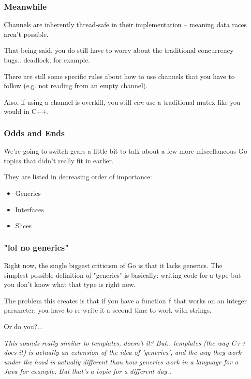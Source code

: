 \documentclass{beamer}
\begin{document}
\begin{frame}
\frametitle{Meanwhile}

Channels are inherently thread-safe in their implementation -- meaning data races aren't possible.

That being said, you do still have to worry about the traditional concurrency bugs.. deadlock, for example.

There are still some specific rules about how to use channels that you have to follow (e.g. not reading from an empty channel).

Also, if using a channel is overkill, you still \textit{can} use a traditional mutex like you would in C++.

\end{frame}

\begin{frame}
\frametitle{Odds and Ends}

We're going to switch gears a little bit to talk about a few more miscellaneous Go topics that didn't really fit in earlier. 

They are listed in decreasing order of importance:

\begin{itemize}
\item Generics
\item Interfaces
\item Slices
\end{itemize}

\end{frame}

\begin{frame}
\frametitle{"lol no generics"}

Right now, the single biggest criticism of Go is that it lacks generics. The simplest possible definition of "generics" is basically: writing code for a type but you don't know what that type is right now.

\vspace{0.5cm}

The problem this creates is that if you have a function \texttt{f} that works on an integer parameter, you have to re-write it a second time to work with strings.

\vspace{0.5cm}

Or do you?...


\hrulefill

\textit{This sounds really similar to templates, doesn't it? But.. templates (the way C++ does it) is actually an extension of the idea of 'generics', and the way they work under the hood is actually different than how generics work in a language for a Java for example. But that's a topic for a different day..}


\end{frame}
\end{document}
